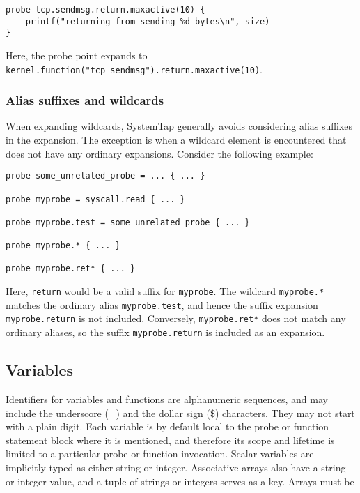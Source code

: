 \documentclass[twoside,english]{article}
\newenvironment{vindent}
{\begin{list}{}{\setlength{\listparindent}{6pt}}
\item[]}
{\end{list}}
\begin{document}
\begin{vindent}
\begin{verbatim}
probe tcp.sendmsg.return.maxactive(10) {
    printf("returning from sending %d bytes\n", size)
}
\end{verbatim}
\end{vindent}

Here, the probe point expands to
\verb+kernel.function("tcp_sendmsg").return.maxactive(10)+.

\subsubsection{Alias suffixes and wildcards}

When expanding wildcards, SystemTap generally avoids considering alias
suffixes in the expansion. The exception is when a wildcard element is
encountered that does not have any ordinary expansions. Consider the
following example:

\begin{vindent}
\begin{verbatim}
probe some_unrelated_probe = ... { ... }

probe myprobe = syscall.read { ... }

probe myprobe.test = some_unrelated_probe { ... }

probe myprobe.* { ... }

probe myprobe.ret* { ... }
\end{verbatim}
\end{vindent}

Here, \verb+return+ would be a valid suffix for \verb+myprobe+. The
wildcard \verb+myprobe.*+ matches the ordinary alias
\verb+myprobe.test+, and hence the suffix expansion
\verb+myprobe.return+ is not included. Conversely, \verb+myprobe.ret*+
does not match any ordinary aliases, so the suffix
\verb+myprobe.return+ is included as an expansion.

\subsection{Variables\label{sub:Variables}}
Identifiers for variables and functions are alphanumeric sequences, and may
include the underscore (\_) and the dollar sign (\$) characters. They may
not start with a plain digit. Each variable is by default local to the probe
or function statement block where it is mentioned, and therefore its scope
and lifetime is limited to a particular probe or function invocation. Scalar
variables are implicitly typed as either string or integer. Associative arrays
also have a string or integer value, and a tuple of strings or integers serves
as a key. Arrays must be declared as global. Local arrays
are not allowed.
\end{document}
